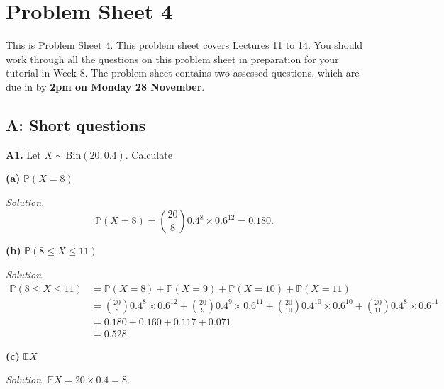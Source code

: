 \documentclass[
  a4paper,
]{book}
\newif\ifcomm\commtrue
\theoremstyle{definition}
\theoremstyle{definition}
\theoremstyle{definition}
\theoremstyle{definition}
\theoremstyle{remark}
\begin{document}
\hypertarget{P4}{%
\chapter*{Problem Sheet 4}\label{P4}}

\commfalse

This is Problem Sheet 4. This problem sheet covers Lectures 11 to 14. You should work through all the questions on this problem sheet in preparation for your tutorial in Week 8. The problem sheet contains two assessed questions, which are due in by \textbf{2pm on Monday 28 November}.

\hypertarget{P4-short}{%
\section*{A: Short questions}\label{P4-short}}

\textbf{A1.} Let \(X \sim \text{Bin}(20, 0.4)\). Calculate

\textbf{(a)} \(\mathbb P(X = 8)\)

\begin{myanswers}
\emph{Solution.}
\[ \mathbb P(X = 8) = \binom{20}{8} 0.4^8 \times 0.6^{12} = 0.180 . \]

\end{myanswers}

\textbf{(b)} \(\mathbb P(8 \leq X \leq 11)\)

\begin{myanswers}
\emph{Solution.}
\begin{align*}
\mathbb P(8 \leq X \leq 11) &= \mathbb P(X = 8) + \mathbb P(X = 9) + \mathbb P(X = 10) + \mathbb P(X = 11) \\ 
&= \binom{20}{8} 0.4^8 \times 0.6^{12} + \binom{20}{9} 0.4^9 \times 0.6^{11} + \binom{20}{10} 0.4^10 \times 0.6^{10} + \binom{20}{11} 0.4^8 \times 0.6^{11} \\
&= 0.180 + 0.160 + 0.117 + 0.071 \\
&= 0.528 .
\end{align*}

\end{myanswers}

\textbf{(c)} \(\mathbb EX\)

\begin{myanswers}
\emph{Solution.} \(\mathbb EX = 20 \times 0.4 = 8\).

\end{myanswers}
\end{document}
